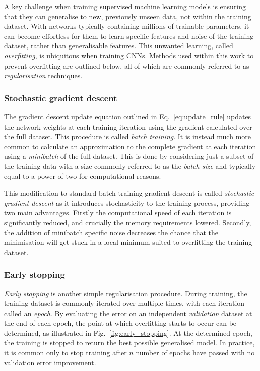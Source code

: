 A key challenge when training supervised machine learning models is ensuring that they can
generalise to new, previously unseen data, not within the training dataset. With networks
typically containing millions of trainable parameters, it can become effortless for them to learn
specific features and noise of the training dataset, rather than generalisable features. This
unwanted learning, called \emph{overfitting}, is ubiquitous when training CNNs. Methods used
within this work to prevent overfitting are outlined below, all of which are commonly referred to
as \emph{regularisation} techniques.

\subsubsection*{Stochastic gradient descent} %

The gradient descent update equation outlined in Eq.~\ref{eq:update_rule} updates the network
weights at each training iteration using the gradient calculated over the full dataset. This
procedure is called \emph{batch training}. It is instead much more common to calculate an
approximation to the complete gradient at each iteration using a \emph{minibatch} of the full
dataset. This is done by considering just a subset of the training data with a size commonly
referred to as the \emph{batch size} and typically equal to a power of two for computational
reasons.

This modification to standard batch training gradient descent is called \emph{stochastic gradient
    descent} as it introduces stochasticity to the training process, providing two main
    advantages. Firstly the computational speed of each iteration is significantly reduced, and
    crucially the memory requirements lowered. Secondly, the addition of minibatch specific noise
    decreases the chance that the minimisation will get stuck in a local minimum suited to
    overfitting the training dataset.

\subsubsection*{Early stopping} %

\emph{Early stopping} is another simple regularisation procedure. During training, the training
dataset is commonly iterated over multiple times, with each iteration called an \emph{epoch}. By
evaluating the error on an independent \emph{validation} dataset at the end of each epoch, the
point at which overfitting starts to occur can be determined, as illustrated in
Fig.~\ref{fig:early_stopping}. At the determined epoch, the training is stopped to return the best
possible generalised model. In practice, it is common only to stop training after $n$ number of
epochs have passed with no validation error improvement.

